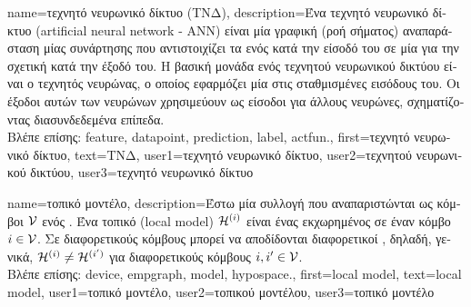 {name={\foreignlanguage{greek}{τεχνητό νευρωνικό δίκτυο (ΤΝΔ)}},
	description={\foreignlanguage{greek}{Ένα τεχνητό νευρωνικό δίκτυο} 
		(artificial neural network - ANN) \foreignlanguage{greek}{είναι μία γραφική (ροή σήματος) αναπαράσταση
		μίας συνάρτησης που αντιστοιχίζει τα}  \foreignlanguage{greek}{ενός}
		 \foreignlanguage{greek}{κατά την είσοδό του σε μία}  
		\foreignlanguage{greek}{για την σχετική}  \foreignlanguage{greek}{κατά την έξοδό του. Η βασική 
		μονάδα ενός τεχνητού νευρωνικού δικτύου είναι ο τεχνητός νευρώνας, ο οποίος εφαρμόζει μία}  
		 \foreignlanguage{greek}{στις σταθμισμένες εισόδους του.  
		Οι έξοδοι αυτών των νευρώνων χρησιμεύουν ως είσοδοι για άλλους νευρώνες, 
		σχηματίζοντας διασυνδεδεμένα επίπεδα.}\\
		\foreignlanguage{greek}{Βλέπε επίσης:} \gls{feature}, \gls{datapoint}, \gls{prediction}, \gls{label}, \gls{actfun}.},
	first={\foreignlanguage{greek}{τεχνητό νευρωνικό δίκτυο}},
	text={\foreignlanguage{greek}{ΤΝΔ}},
	user1={\foreignlanguage{greek}{τεχνητό νευρωνικό δίκτυο}}, %
	user2={\foreignlanguage{greek}{τεχνητού νευρωνικού δικτύου}}, %
	user3={\foreignlanguage{greek}{τεχνητό νευρωνικό δίκτυο}} %
}

{name={\foreignlanguage{greek}{τοπικό μοντέλο}},
	description={\foreignlanguage{greek}{Έστω μία συλλογή}  
		\foreignlanguage{greek}{που αναπαριστώνται ως κόμβοι $\mathcal{V}$ ενός} . \foreignlanguage{greek}{Ένα τοπικό} 
		 (local model) $\mathcal{H}^{(i)}$ 
		\foreignlanguage{greek}{είναι ένας}  \foreignlanguage{greek}{εκχωρημένος σε έναν κόμβο $i \in \mathcal{V}$. 
		Σε διαφορετικούς κόμβους μπορεί να αποδίδονται διαφορετικοί} , \foreignlanguage{greek}{δηλαδή, γενικά, 
		$\mathcal{H}^{(i)} \neq \mathcal{H}^{(i')}$ για διαφορετικούς κόμβους} $i, i' \in \mathcal{V}$.\\
		\foreignlanguage{greek}{Βλέπε επίσης:} \gls{device}, \gls{empgraph}, \gls{model}, \gls{hypospace}.},
		first={local model},
		text={local model},
		user1={\foreignlanguage{greek}{τοπικό μοντέλο}}, %
		user2={\foreignlanguage{greek}{τοπικού μοντέλου}}, %
		user3={\foreignlanguage{greek}{τοπικό μοντέλο}} %
}

